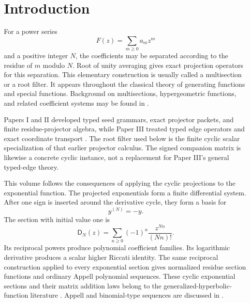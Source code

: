 \documentclass[11pt,letterpaper]{article}
\theoremstyle{definition}
\theoremstyle{remark}
\newcommand{\Dfun}{\mathsf D}
\begin{document}
\clearpage
\tableofcontents
\listoffigures
\clearpage{}

\section{Introduction}\label{sec:introduction}

For a power series
\[
F(z)=\sum_{m\geq 0}a_mz^m
\]
and a positive integer $N$, the coefficients may be separated according to the residue of $m$ modulo $N$.  Root of unity averaging gives exact projection operators for this separation.  This elementary construction is usually called a multisection or a root filter.  It appears throughout the classical theory of generating functions and special functions.  Background on multisections, hypergeometric functions, and related coefficient systems may be found in \cite{Rainville1960,AndrewsAskeyRoy1999,Comtet1974}.

Papers I and II developed typed seed grammars, exact projector packets, and
finite residue-projector algebra, while Paper III treated typed edge operators
and exact coordinate transport \cite{PaperI2026,PaperII2026,PaperIII2026}.
The root filter used below is the finite cyclic scalar specialization of that
earlier projector calculus. The signed companion matrix is likewise a concrete
cyclic instance, not a replacement for Paper III's general typed-edge theory.

This volume follows the consequences of applying the cyclic projections to the exponential function.  The projected exponentials form a finite differential system.  After one sign is inserted around the derivative cycle, they form a basis for
\[
y^{(N)}=-y.
\]
The section with initial value one is
\[
\Dfun_N(z)=\sum_{n\geq 0}(-1)^n\frac{z^{Nn}}{(Nn)!}.
\]
Its reciprocal powers produce polynomial coefficient families. Its logarithmic
derivative produces a scalar higher Riccati identity. The same reciprocal
construction applied to every exponential section gives normalized
residue section functions and ordinary Appell polynomial sequences. These
cyclic exponential sections and their matrix addition laws belong to the
generalized-hyperbolic-function literature
\cite{Schwaiger1992,Muldoon2005}. Appell and binomial-type sequences are
discussed in \cite{Roman1984,Comtet1974}.
\end{document}

